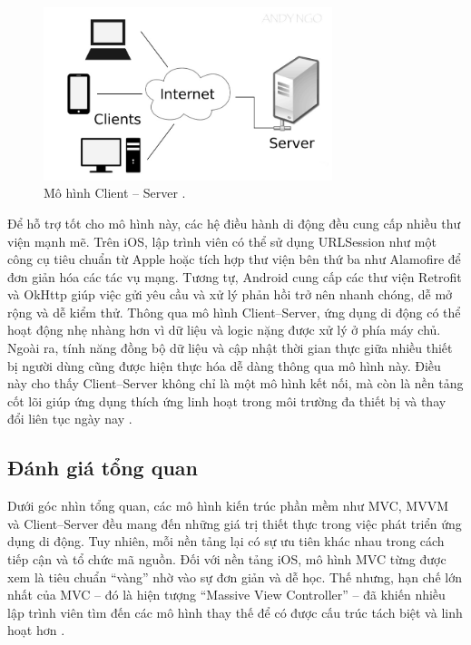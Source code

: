 \begin{figure}[H]
    \centering
    \includegraphics[width=0.75\textwidth]{images/client-server.jpg}
    \caption{Mô hình Client – Server \cite{codelearnClientServer}.}
    \label{fig:fig14}
  \end{figure}

    
      \hspace*{0.8cm}Để hỗ trợ tốt cho mô hình này, các hệ điều hành di động đều cung cấp nhiều thư viện mạnh mẽ. Trên iOS, lập trình viên có thể sử dụng URLSession như một công cụ tiêu chuẩn từ Apple hoặc tích hợp thư viện bên thứ ba như Alamofire để đơn giản hóa các tác vụ mạng. Tương tự, Android cung cấp các thư viện Retrofit và OkHttp giúp việc gửi yêu cầu và xử lý phản hồi trở nên nhanh chóng, dễ mở rộng và dễ kiểm thử. Thông qua mô hình Client–Server, ứng dụng di động có thể hoạt động nhẹ nhàng hơn vì dữ liệu và logic nặng được xử lý ở phía máy chủ. Ngoài ra, tính năng đồng bộ dữ liệu và cập nhật thời gian thực giữa nhiều thiết bị người dùng cũng được hiện thực hóa dễ dàng thông qua mô hình này. Điều này cho thấy Client–Server không chỉ là một mô hình kết nối, mà còn là nền tảng cốt lõi giúp ứng dụng thích ứng linh hoạt trong môi trường đa thiết bị và thay đổi liên tục ngày nay \cite{scalable_mobile_arch}.
    

\subsection{Đánh giá tổng quan}
\renewcommand{\labelitemi}{--}    
    
        \hspace*{0.8cm}Dưới góc nhìn tổng quan, các mô hình kiến trúc phần mềm như MVC, MVVM và Client–Server đều mang đến những giá trị thiết thực trong việc phát triển ứng dụng di động. Tuy nhiên, mỗi nền tảng lại có sự ưu tiên khác nhau trong cách tiếp cận và tổ chức mã nguồn. Đối với nền tảng iOS, mô hình MVC từng được xem là tiêu chuẩn “vàng” nhờ vào sự đơn giản và dễ học. Thế nhưng, hạn chế lớn nhất của MVC – đó là hiện tượng “Massive View Controller” – đã khiến nhiều lập trình viên tìm đến các mô hình thay thế để có được cấu trúc tách biệt và linh hoạt hơn \cite{massive_view_controller}.
    
